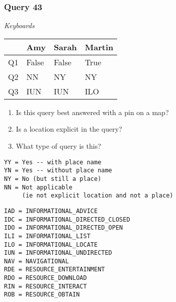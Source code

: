\begin{frame}[fragile]
\frametitle{Query 43}
\vspace{1em}

\emph{Keyboards}

\vfill

\begin{table}
  \centering
  \begin{tabular}{ l l l l }
    & \textbf{Amy} & \textbf{Sarah} & \textbf{Martin}\\
    \toprule
    Q1 & False & False & True\\
Q2 & NN & NY & NY\\
Q3 & IUN & IUN & ILO\\
    \bottomrule
  \end{tabular}
\end{table}

\vfill

\tiny{

\begin{enumerate}
\item Is this query best answered with a pin on a map?
\item Is a location explicit in the query?
\item What type of query is this?
\end{enumerate}

\vfill

\begin{multicols}{2}
\begin{verbatim}
YY = Yes -- with place name
YN = Yes -- without place name
NY = No (but still a place)
NN = Not applicable 
     (ie not explicit location and not a place)
\end{verbatim}

\columnbreak
\begin{verbatim}
IAD = INFORMATIONAL_ADVICE
IDC = INFORMATIONAL_DIRECTED_CLOSED
IDO = INFORMATIONAL_DIRECTED_OPEN
ILI = INFORMATIONAL_LIST
ILO = INFORMATIONAL_LOCATE
IUN = INFORMATIONAL_UNDIRECTED
NAV = NAVIGATIONAL
RDE = RESOURCE_ENTERTAINMENT
RDO = RESOURCE_DOWNLOAD
RIN = RESOURCE_INTERACT
ROB = RESOURCE_OBTAIN
\end{verbatim}
\end{multicols}
}

\end{frame}



